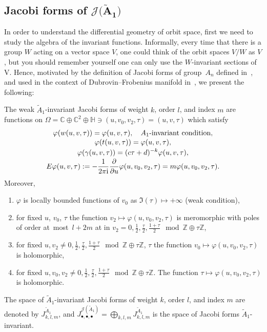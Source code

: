 \documentclass[pdftex]{sigma}%
\numberwithin{equation}{section}
\newcommand{\Ja}{\mathcal{J}}
\begin{document}
\subsection[Jacobi forms of J(A1)]{Jacobi forms of $\boldsymbol{\Ja\big(\tilde A_1\big)}$}\label{Jacobi forms Jtildea1}
In order to understand the differential geometry of orbit space, first we need to study the algebra of the invariant functions. Informally, every time that there is a group $W$ acting on a vector space $V$, one could think of the orbit spaces $V/W$ as $V$, but you should remember yourself one can only use the $W$-invariant sections of V. Hence, motivated by the definition of Jacobi forms of group~$A_n$ defined in~\cite{K.Wirthmuller}, and used in the context of Dubrovin--Frobenius manifold in~\cite{BertolaM.1,BertolaM.2}, we present the following:

\begin{Definition}\label{meromorphic jacobi forms}
The weak $\tilde A_1$-invariant Jacobi forms of weight $k$, order $l$, and index $m$ are functions on $\Omega=\mathbb{C}\oplus\mathbb{C}^2\oplus\mathbb{H}\ni (u,v_0,v_2,\tau)=(u,v,\tau)$ which satisfy
\begin{gather}
\varphi(w(u,v,\tau))=\varphi(u,v,\tau),\quad \textrm{$A_1$-invariant condition},\nonumber
\\[-.5ex]
\varphi(t(u,v,\tau))=\varphi(u,v,\tau),\nonumber
\\[-.5ex]
\varphi(\gamma(u,v,\tau))=(c\tau+d)^{-k}\varphi(u,v,\tau),\nonumber
\\[-.5ex]
E\varphi(u,v,\tau):=-\frac{1}{2\pi {\rm i}}\frac{\partial}{\partial u}\varphi(u,v_0,v_2,\tau)=m\varphi(u,v_0,v_2,\tau).
\label{jacobiform}
\end{gather}
Moreover,
\begin{enumerate}\itemsep=0pt
\item[1)] $\varphi$ is locally bounded functions of $v_0$ as $\Im(\tau)\mapsto +\infty$ (weak condition),
\item[2)] for fixed $u$, $v_0$, $\tau$ the function $v_{2}\mapsto \varphi(u,v_0,v_2,\tau)$ is meromorphic with poles of order at~most~$l+2m$ at in $v_{2}=0,\frac{1}{2},\frac{\tau}{2},\frac{1+\tau}{2} \mod\mathbb{Z}\oplus\tau\mathbb{Z}$,
\item[3)] for fixed $u,v_2\neq 0,\frac{1}{2},\frac{\tau}{2},\frac{1+\tau}{2} \mod \mathbb{Z}\oplus\tau\mathbb{Z}$, $\tau$ the function $v_{0}\mapsto \varphi(u,v_0,v_2,\tau)$ is holo\-morphic,
\item[4)] for fixed $u,v_0,v_2\neq 0,\frac{1}{2},\frac{\tau}{2},\frac{1+\tau}{2}\mod \mathbb{Z}\oplus\tau\mathbb{Z}$. The function $\tau\mapsto \varphi(u,v_0,v_2,\tau)$ is holo\-morphic.
\end{enumerate}
The space of $\tilde A_1$-invariant Jacobi forms of weight $k$, order $l$, and index $m$ are denoted by $J_{k,l,m}^{\tilde A_1}$, and $J_{\bullet,\bullet,\bullet}^{\Ja(\tilde A_1)}=\bigoplus _{k,l,m}J_{k,l,m}^{\tilde A_1}$ is the space of Jacobi forms $\tilde A_1$-invariant.
\end{Definition}
\end{document}

